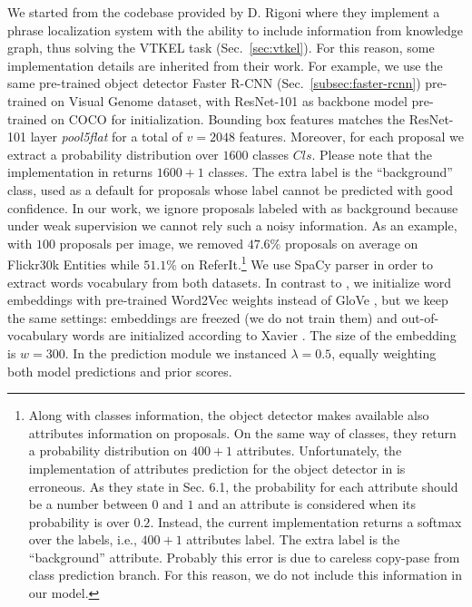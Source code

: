We started from the codebase provided by D. Rigoni \etal{}
\cite{rigoni2021better} where they implement a phrase localization
system with the ability to include information from knowledge graph,
thus solving the VTKEL task (Sec.~\ref{sec:vtkel}). For this reason,
some implementation details are inherited from their work. For
example, we use the same pre-trained object detector Faster R-CNN
(Sec.~\ref{subsec:faster-rcnn}) pre-trained on Visual Genome
\cite{krishna2017visual} dataset, with ResNet-101 as backbone model
pre-trained on COCO for initialization. Bounding box features matches
the ResNet-101 layer \textit{pool5\textunderscore flat} for a total of
$v = 2048$ features. Moreover, for each proposal we extract a
probability distribution over $1600$ classes $Cls$. Please note that
the implementation in \cite{anderson2018bottom} returns $1600 + 1$
classes. The extra label is the ``background'' class, used as a
default for proposals whose label cannot be predicted with good
confidence. In our work, we ignore proposals labeled with as
background because under weak supervision we cannot rely such a noisy
information. As an example, with $100$ proposals per image, we removed
$47.6\%$ proposals on average on Flickr30k Entities while $51.1\%$ on
ReferIt.\footnote{Along with classes information, the object detector
makes available also attributes information on proposals. On the same
way of classes, they return a probability distribution on $400 + 1$
attributes. Unfortunately, the implementation of attributes prediction
for the object detector in \cite{anderson2018bottom} is erroneous. As
they state in Sec. 6.1, the probability for each attribute should be a
number between $0$ and $1$ and an attribute is considered when its
probability is over $0.2$. Instead, the current implementation returns
a softmax over the labels, i.e., $400 + 1$ attributes label. The extra
label is the ``background'' attribute. Probably this error is due to
careless copy-pase from class prediction branch. For this reason, we
do not include this information in our model.} We use SpaCy
\cite{honnibal2020spacy} parser in order to extract words vocabulary
from both datasets. In contrast to \cite{rigoni2021better}, we
initialize word embeddings with pre-trained Word2Vec
\cite{mikolov2013efficient} weights instead of GloVe
\cite{pennington2014glove}, but we keep the same settings: embeddings
are freezed (we do not train them) and out-of-vocabulary words are
initialized according to Xavier \cite{glorot2010understanding}. The
size of the embedding is $w = 300$. In the prediction module we
instanced $\lambda = 0.5$, equally weighting both model predictions and
prior scores.

